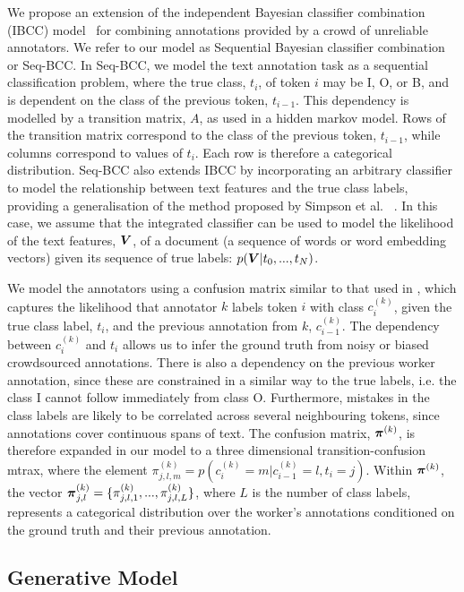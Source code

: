 We propose an extension of the independent Bayesian classifier combination (IBCC) 
model~\cite{kim2012bayesian} for combining annotations provided by a crowd of unreliable annotators. We refer to our model as Sequential Bayesian classifier combination or Seq-BCC. In Seq-BCC, we model the text annotation task as a sequential classification problem, where the true class, $t_i$, of token $i$ may be I, O, or B, and is dependent on the class of the previous token, $t_{i-1}$. This dependency is modelled by a transition matrix, $A$, as used in a hidden markov model. Rows of the transition matrix correspond to the class of the previous token, $t_{i-1}$, while columns correspond to values of $t_i$. Each row is therefore a categorical distribution. Seq-BCC also extends IBCC by incorporating an arbitrary classifier to model the relationship between text features and the true class labels,
providing a generalisation of the method proposed by Simpson et al. ~. In this case,
we assume that the integrated classifier can be used to model the likelihood of the text features, $\boldsymbol V$, of a document (a sequence of words or word embedding vectors) given its sequence of true labels: $p(\boldsymbol V | t_0, ..., t_N)$. %

We model the annotators using a confusion matrix similar to that used in \cite{simpsonlong}, which captures the likelihood that annotator $k$ labels token $i$ with class $c_i^{(k)}$, given the true class label, $t_i$, and the previous annotation from $k$, $c_{i-1}^{(k)}$. The dependency between $c_i^{(k)}$ and $t_i$ allows us to infer the ground truth from noisy or biased crowdsourced annotations. There is also a dependency on the previous worker annotation, since these are constrained in a similar way to the true labels, i.e. the class I cannot follow immediately from class O. Furthermore, mistakes in the class labels are likely to be correlated across several neighbouring tokens, since annotations cover continuous
spans of text. The confusion matrix, $\boldsymbol\pi^{(k)}$, is therefore expanded in our model to a three dimensional transition-confusion mtrax, where the element $\pi_{j,l,m}^{(k)} = p(c_i^{(k)} = m | c_{i-1}^{(k)}=l, t_i=j)$. Within $\boldsymbol\pi^{(k)}$, the vector $\boldsymbol\pi_{j,l}^{(k)} = \{ \pi_{j,l,1}^{(k)},...,\pi_{j,l,L}^{(k)}\} $, where $L$ is the number of class labels, represents a categorical distribution over the worker's annotations conditioned on the ground truth and their previous annotation.

\subsection{Generative Model}

